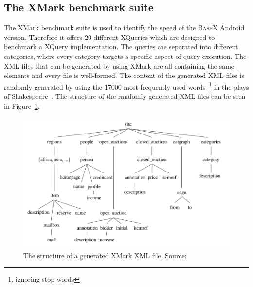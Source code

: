 \subsection{The XMark benchmark suite}
\label{subsec:the-xmark-benchmark-suite}
The XMark benchmark suite is used to identify the speed of the \textsc{BaseX} Android version.
Therefore it offers 20 different XQueries which are designed to benchmark a XQuery implementation.
The queries are separated into different categories, where every category targets a specific aspect of query execution.
The XML files that can be generated by using XMark are all containing the same elements and every file is well-formed.
The content of the generated XML files is randomly generated by using the 17000 most frequently used words~\footnote{ignoring stop words} in the plays of Shakespeare~\cite{schmidtxmark}.
The structure of the randomly generated XML files can be seen in Figure~\ref{fig:xmark-file-structure}.
\begin{figure}[htpb]
\begin{center}
\includegraphics[scale=0.42]{images/xmark-file-elements.png} 
\caption{The structure of a generated XMark XML file. Source:\cite{schmidtxmark}}
\label{fig:xmark-file-structure}
\end{center}
\end{figure}

